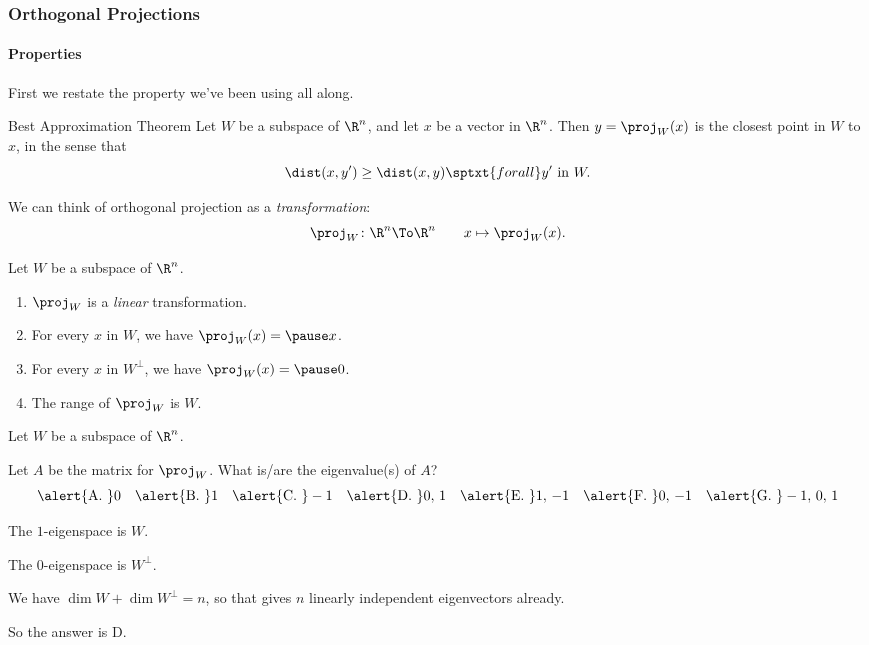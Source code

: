 \begin{frame}
\frametitle{Orthogonal Projections}
\framesubtitle{Properties}

First we restate the property we've been using all along.

\begin{oneoffthm}{Best Approximation Theorem}
  Let $W$ be a subspace of $\R^n$, and let $x$ be a vector in $\R^n$.  Then
  $y = \proj_W(x)$ is the closest point in $W$ to $x$, in the sense that
  \[ \dist(x,y') \geq \dist(x,y) \sptxt{for all} y'\text{ in }W. \]
\end{oneoffthm}

\pause
We can think of orthogonal projection as a \emph{transformation}:
\[ \proj_W\colon\R^n\To\R^n \qquad x \mapsto \proj_W(x). \]

\pause
\begin{thm}
  Let $W$ be a subspace of $\R^n$.
  \pause
  \begin{enumerate}
  \item $\proj_W$ is a \emph{linear} transformation.
    \pause
  \item For every $x$ in $W$, we have $\proj_W(x) = \pause x$.
    \pause
  \item For every $x$ in $W^\perp$, we have $\proj_W(x) = \pause 0$.
    \pause
  \item The range of $\proj_W$ is
    \pause
    $W$.
  \end{enumerate}
\end{thm}

\end{frame}



\begin{pollframe}

\begin{poll}
Let $W$ be a subspace of $\R^n$.

\begin{bluebox}[Poll]{.9\linewidth}
  Let $A$ be the matrix for $\proj_W$.  What is/are the eigenvalue(s) of $A$?
  \[
  \text{\alert{A. }} 0 \quad
  \text{\alert{B. }} 1 \quad
  \text{\alert{C. }} -1 \quad
  \text{\alert{D. }} 0,\, 1 \quad
  \text{\alert{E. }} 1,\,-1 \quad
  \text{\alert{F. }} 0,\,-1 \quad
  \text{\alert{G. }} -1,\,0,\,1
  \]
\end{bluebox}

\pause\medskip
The $1$-eigenspace is
\pause
$W$.

\pause\medskip
The $0$-eigenspace is
\pause
$W^\perp$.

\pause\medskip
We have $\dim W+\dim W^\perp = n$, so that gives $n$ linearly independent
eigenvectors already.

\pause\medskip
So the answer is \alert{D}.
\end{poll}

\end{pollframe}


